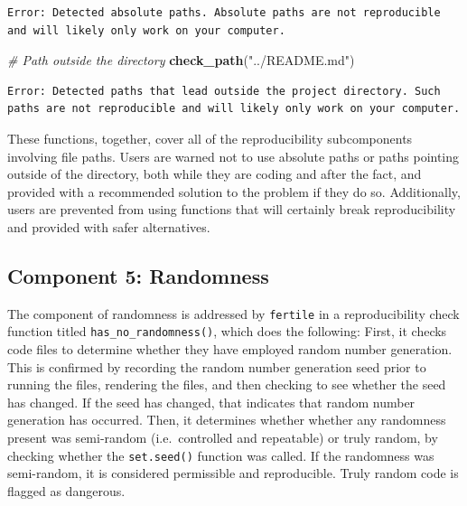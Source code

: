 \documentclass[12pt,twoside]{reedthesis}
\newenvironment{Shaded}{\begin{snugshade}}{\end{snugshade}}
\newcommand{\CommentTok}[1]{\textcolor[rgb]{0.56,0.35,0.01}{\textit{#1}}}
\newcommand{\KeywordTok}[1]{\textcolor[rgb]{0.13,0.29,0.53}{\textbf{#1}}}
\newcommand{\NormalTok}[1]{#1}
\newcommand{\StringTok}[1]{\textcolor[rgb]{0.31,0.60,0.02}{#1}}
\begin{document}
\begin{verbatim}
Error: Detected absolute paths. Absolute paths are not reproducible and will likely only work on your computer.
\end{verbatim}
\begin{Shaded}
\begin{Highlighting}[]
\CommentTok{# Path outside the directory}
\KeywordTok{check_path}\NormalTok{(}\StringTok{"../README.md"}\NormalTok{)}
\end{Highlighting}
\end{Shaded}
\begin{verbatim}
Error: Detected paths that lead outside the project directory. Such paths are not reproducible and will likely only work on your computer.
\end{verbatim}
These functions, together, cover all of the reproducibility subcomponents involving file paths. Users are warned not to use absolute paths or paths pointing outside of the directory, both while they are coding and after the fact, and provided with a recommended solution to the problem if they do so. Additionally, users are prevented from using functions that will certainly break reproducibility and provided with safer alternatives.

\hypertarget{component-5-randomness}{%
\subsection{Component 5: Randomness}\label{component-5-randomness}}

The component of randomness is addressed by \texttt{fertile} in a reproducibility check function titled \texttt{has\_no\_randomness()}, which does the following: First, it checks code files to determine whether they have employed random number generation. This is confirmed by recording the random number generation seed prior to running the files, rendering the files, and then checking to see whether the seed has changed. If the seed has changed, that indicates that random number generation has occurred. Then, it determines whether whether any randomness present was semi-random (i.e.~controlled and repeatable) or truly random, by checking whether the \texttt{set.seed()} function was called. If the randomness was semi-random, it is considered permissible and reproducible. Truly random code is flagged as dangerous.
\end{document}
